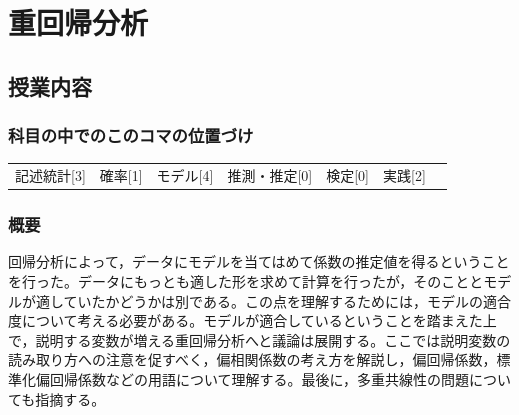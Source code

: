 \section{重回帰分析}
\label{s10_MultipleRegression}

\subsection{授業内容}
\subsubsection{科目の中でのこのコマの位置づけ}
\begin{tabular}[t]{ccccccc}
	記述統計[3] & 確率[1] & モデル[4] & 推測・推定[0] & 検定[0] & 実践[2]
\end{tabular}

\subsubsection{概要}
回帰分析によって，データにモデルを当てはめて係数の推定値を得るということを行った。データにもっとも適した形を求めて計算を行ったが，そのこととモデルが適していたかどうかは別である。この点を理解するためには，モデルの適合度について考える必要がある。モデルが適合しているということを踏まえた上で，説明する変数が増える重回帰分析へと議論は展開する。ここでは説明変数の読み取り方への注意を促すべく，偏相関係数の考え方を解説し，偏回帰係数，標準化偏回帰係数などの用語について理解する。最後に，多重共線性の問題についても指摘する。
